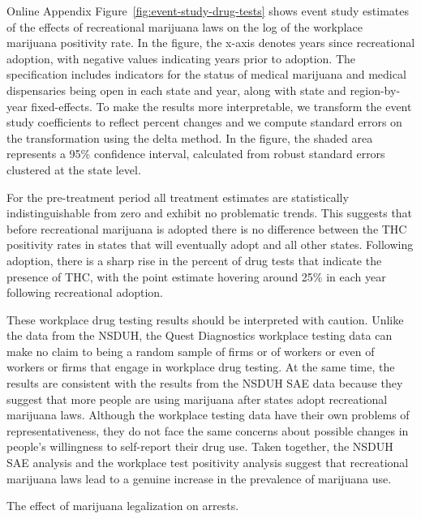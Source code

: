\documentclass[12pt]{article}%
\begin{document}
Online Appendix Figure~\ref{fig:event-study-drug-tests} shows event study estimates of the effects of recreational marijuana laws on the log of the workplace marijuana positivity rate. 
In the figure, the x-axis denotes years since recreational adoption, with negative values indicating years prior to adoption. 
The specification includes indicators for the status of medical marijuana and medical dispensaries being open in each state and year, along with state and region-by-year fixed-effects.
To make the results more interpretable, we transform the event study coefficients to reflect percent changes and we compute standard errors on the transformation using the delta method. In the figure, the shaded area represents a 95\% confidence interval, calculated from robust standard errors clustered at the state level.

For the pre-treatment period all treatment estimates are statistically indistinguishable from zero and exhibit no problematic trends. 
This suggests that before recreational marijuana is adopted there is no difference between the THC positivity rates in states that will eventually adopt and all other states. 
Following adoption, there is a sharp rise in the percent of drug tests that indicate the presence of THC, with the point estimate hovering around 25\% in each year following recreational adoption. 

These workplace drug testing results should be interpreted with caution. 
Unlike the data from the NSDUH, the Quest Diagnostics workplace testing data can make no claim to being a random sample of firms or of workers or even of workers or firms that engage in workplace drug testing. 
At the same time, the results are consistent with the results from the NSDUH SAE data because they suggest that more people are using marijuana after states adopt recreational marijuana laws. 
Although the workplace testing data have their own problems of representativeness, they do not face the same concerns about possible changes in people's willingness to self-report their drug use. 
Taken together, the NSDUH SAE analysis and the workplace test positivity analysis suggest that recreational marijuana laws lead to a genuine increase in the prevalence of marijuana use.


\begin{table}[ht]\centering
    \begin{adjustbox}{width=.7\textwidth}
    \centering
      \begin{threeparttable}
        \caption{The effect of marijuana legalization on arrests.}
      \label{tab:arrest_poisson}
      \end{threeparttable}
     \end{adjustbox}
\end{table}
\end{document}
